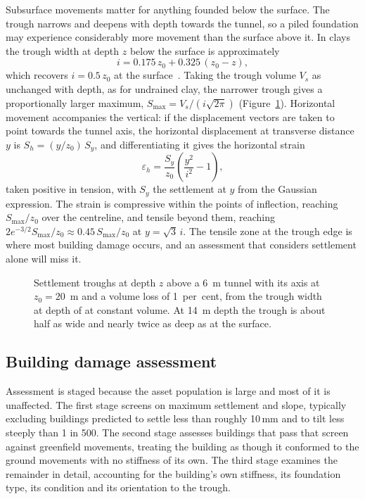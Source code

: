 Subsurface movements matter for anything founded below the surface. The trough
narrows and deepens with depth towards the tunnel, so a piled foundation may
experience considerably more movement than the surface above it. In clays the
trough width at depth $z$ below the surface is approximately
\[
i = 0.175\, z_0 + 0.325\,(z_0 - z),
\]
which recovers $i = 0.5\,z_0$ at the surface~\citep{mair1993subsurface}. Taking
the trough volume $V_s$ as unchanged with depth, as for undrained clay, the
narrower trough gives a proportionally larger maximum,
$S_{\max} = V_s/(i\sqrt{2\pi})$ (Figure~\ref{fig:subsurface-trough}). Horizontal
movement accompanies the vertical: if the displacement vectors are taken to
point towards the tunnel axis, the horizontal displacement at transverse
distance $y$ is $S_h = (y/z_0)\, S_y$, and differentiating it gives the
horizontal strain~\citep{mair1996subsurface}
\[
\varepsilon_h = \frac{S_y}{z_0}\left(\frac{y^2}{i^2} - 1\right),
\]
taken positive in tension, with $S_y$ the settlement at $y$ from the
Gaussian expression. The strain is compressive within the points of
inflection, reaching $S_{\max}/z_0$ over the centreline, and tensile beyond
them, reaching $2e^{-3/2}S_{\max}/z_0 \approx 0.45\,S_{\max}/z_0$ at
$y = \sqrt{3}\,i$. The tensile zone at the trough edge is where most building
damage occurs, and an assessment that considers settlement alone will miss it.

\begin{figure}[htbp]
\centering
{}
\caption{Settlement troughs at depth $z$ above a 6~m tunnel with its axis at $z_0 = 20$~m and a volume loss of 1~per~cent, from the trough width at depth of \citet{mair1993subsurface} at constant volume. At 14~m depth the trough is about half as wide and nearly twice as deep as at the surface.}
\label{fig:subsurface-trough}
\end{figure}

\subsection{Building damage assessment}
\label{sec:damage-assessment}

Assessment is staged because the asset population is large and most of it is
unaffected. The first stage screens on maximum settlement and slope, typically
excluding buildings predicted to settle less than roughly 10\,mm and to tilt
less steeply than 1 in 500.
The second stage assesses buildings that pass that screen against greenfield
movements, treating the building as though it conformed to the ground
movements with no stiffness of its own. The third stage examines the remainder
in detail, accounting for the building's own stiffness, its foundation type,
its condition and its orientation to the trough.

